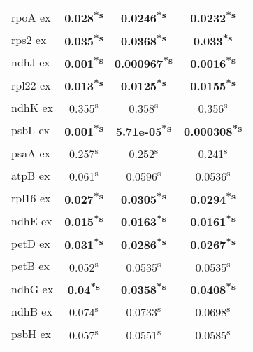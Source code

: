 \documentclass[a4paper]{article}
\begin{document}
\begin{longtable}{l|c|c|c}
rpoA ex&\textbf{0.028\textsuperscript{*}\textsuperscript{s}}&\textbf{0.0246\textsuperscript{*}\textsuperscript{s}}&\textbf{0.0232\textsuperscript{*}\textsuperscript{s}}\\
rps2 ex&\textbf{0.035\textsuperscript{*}\textsuperscript{s}}&\textbf{0.0368\textsuperscript{*}\textsuperscript{s}}&\textbf{0.033\textsuperscript{*}\textsuperscript{s}}\\
ndhJ ex&\textbf{0.001\textsuperscript{*}\textsuperscript{s}}&\textbf{0.000967\textsuperscript{*}\textsuperscript{s}}&\textbf{0.0016\textsuperscript{*}\textsuperscript{s}}\\
rpl22 ex&\textbf{0.013\textsuperscript{*}\textsuperscript{s}}&\textbf{0.0125\textsuperscript{*}\textsuperscript{s}}&\textbf{0.0155\textsuperscript{*}\textsuperscript{s}}\\
ndhK ex&0.355\textsuperscript{s}&0.358\textsuperscript{s}&0.356\textsuperscript{s}\\
psbL ex&\textbf{0.001\textsuperscript{*}\textsuperscript{s}}&\textbf{5.71e-05\textsuperscript{*}\textsuperscript{s}}&\textbf{0.000308\textsuperscript{*}\textsuperscript{s}}\\
psaA ex&0.257\textsuperscript{s}&0.252\textsuperscript{s}&0.241\textsuperscript{s}\\
atpB ex&0.061\textsuperscript{s}&0.0596\textsuperscript{s}&0.0536\textsuperscript{s}\\
rpl16 ex&\textbf{0.027\textsuperscript{*}\textsuperscript{s}}&\textbf{0.0305\textsuperscript{*}\textsuperscript{s}}&\textbf{0.0294\textsuperscript{*}\textsuperscript{s}}\\
ndhE ex&\textbf{0.015\textsuperscript{*}\textsuperscript{s}}&\textbf{0.0163\textsuperscript{*}\textsuperscript{s}}&\textbf{0.0161\textsuperscript{*}\textsuperscript{s}}\\
petD ex&\textbf{0.031\textsuperscript{*}\textsuperscript{s}}&\textbf{0.0286\textsuperscript{*}\textsuperscript{s}}&\textbf{0.0267\textsuperscript{*}\textsuperscript{s}}\\
petB ex&0.052\textsuperscript{s}&0.0535\textsuperscript{s}&0.0535\textsuperscript{s}\\
ndhG ex&\textbf{0.04\textsuperscript{*}\textsuperscript{s}}&\textbf{0.0358\textsuperscript{*}\textsuperscript{s}}&\textbf{0.0408\textsuperscript{*}\textsuperscript{s}}\\
ndhB ex&0.074\textsuperscript{s}&0.0733\textsuperscript{s}&0.0698\textsuperscript{s}\\
psbH ex&0.057\textsuperscript{s}&0.0551\textsuperscript{s}&0.0585\textsuperscript{s}\\

\end{longtable}
\end{document}
